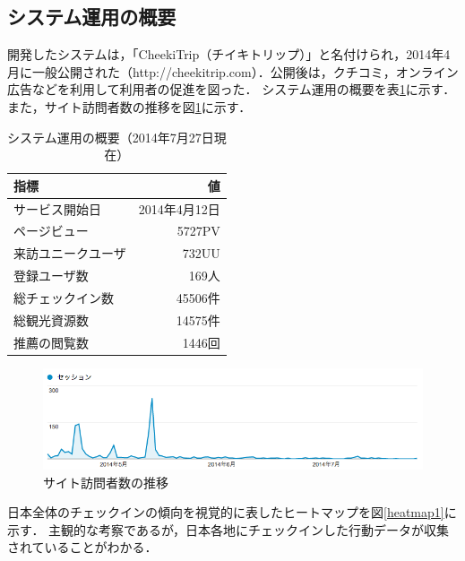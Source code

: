 \documentclass{jsarticle}
\begin{document}
\newpage
\subsection{システム運用の概要}

開発したシステムは，「CheekiTrip（チイキトリップ）」と名付けられ，2014年4月に一般公開された（http://cheekitrip.com）．公開後は，クチコミ，オンライン広告などを利用して利用者の促進を図った．
システム運用の概要を表\ref{operation_description}に示す．また，サイト訪問者数の推移を図\ref{proc_users}に示す．


\begin{table}[!h]
\small
\caption{システム運用の概要（2014年7月27日現在）}
\begin{center}
\begin{tabular}{l|r}
\label{operation_description}
指標 & 値 \\ \hline
サービス開始日 & 2014年4月12日 \\
ページビュー & 5727PV \\
来訪ユニークユーザ & 732UU \\
登録ユーザ数 & 169人 \\
総チェックイン数 & 45506件 \\
総観光資源数 & 14575件 \\
推薦の閲覧数 & 1446回 \\
\end{tabular}
\end{center}
\end{table}

\begin{figure}[!ht]
\begin{center}
\includegraphics[width=15.0cm]{./image/proc_users.png}
\caption{サイト訪問者数の推移}
\label{proc_users}
\end{center}
\end{figure}
    
日本全体のチェックインの傾向を視覚的に表したヒートマップを図\ref{heatmap1}に示す．
主観的な考察であるが，日本各地にチェックインした行動データが収集されていることがわかる．
\end{document}
